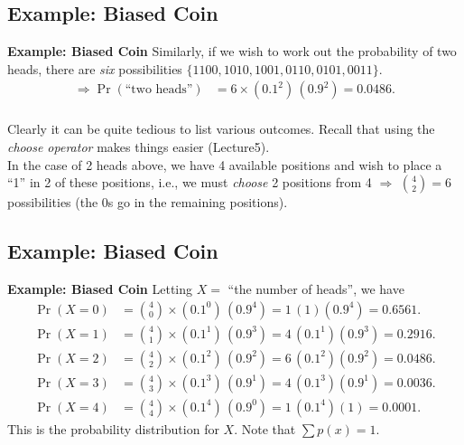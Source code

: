\documentclass[compress]{beamer}        %
\makeatletter
\newcommand{\tcb}{\textcolor{beamer@blendedblue}}
\makeatother
\begin{document}
\subsection{Example: Biased Coin}
\begin{frame}{\bf \tcb{Example: Biased Coin}}
Similarly, if we wish to work out the probability of two heads, there are \emph{six} possibilities $\{1100,1010,1001,0110,0101,0011\}$.
\begin{align*}
\Rightarrow \Pr(\text{``two heads''}) &= 6 \times (0.1^2)\,(0.9^2) =0.0486.\\[-0.2cm]
\end{align*}

Clearly it can be quite tedious to list various outcomes.
Recall that using the \emph{choose operator} makes things easier (Lecture5).\\[0.7cm]

In the case of 2 heads above, we have 4 available positions and wish to place a ``1'' in 2 of these positions, i.e., we must \emph{choose} 2 positions from 4 $\Rightarrow$ $\binom{4}{2} =6$ possibilities (the 0s go in the remaining positions).

\end{frame}


\subsection{Example: Biased Coin}
\begin{frame}{\bf \tcb{Example: Biased Coin}}
Letting $X =$ ``the number of heads'', we have
\begin{align*}
\Pr(X=0) &= \binom{4}{0} \times (0.1^0) \, (0.9^4) = 1\,(1)(0.9^4) = 0.6561.\\[0.2cm]
\Pr(X=1) &= \binom{4}{1} \times (0.1^1) \, (0.9^3) = 4\,(0.1^1)(0.9^3) = 0.2916.\\[0.2cm]
\Pr(X=2) &= \binom{4}{2} \times (0.1^2) \, (0.9^2) = 6\,(0.1^2)(0.9^2) = 0.0486.\\[0.2cm]
\Pr(X=3) &= \binom{4}{3} \times (0.1^3) \, (0.9^1) = 4\,(0.1^3)(0.9^1) = 0.0036.\\[0.2cm]
\Pr(X=4) &= \binom{4}{4} \times (0.1^4) \, (0.9^0) = 1\,(0.1^4)(1) = 0.0001.
\end{align*}
This is the probability distribution for $X$. Note that $\sum p(x) = 1$.
\end{frame}
\end{document}
